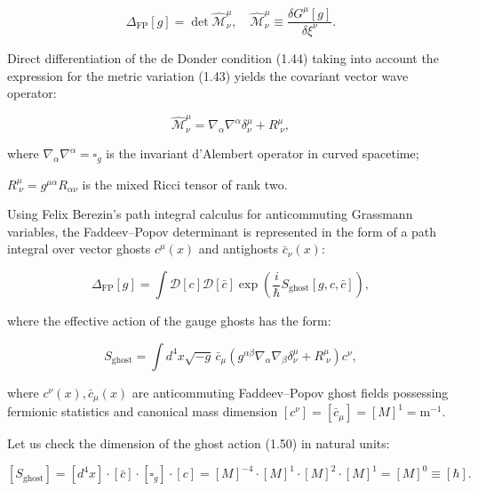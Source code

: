 \documentclass[11pt,a4paper]{article}
\theoremstyle{definition}
\begin{document}
\begin{equation}\label{eq:1.46}\tag{1.46}
\Delta_{\text{FP}}[g] = \det \hat{\mathcal{M}}^\mu_\nu, \quad \hat{\mathcal{M}}^\mu_\nu \equiv \frac{\delta G^\mu[g]}{\delta \xi^\nu}.
\end{equation}

Direct differentiation of the de Donder condition (1.44) taking into account the expression for the metric variation (1.43) yields the covariant vector wave operator:

\begin{equation}\label{eq:1.47}\tag{1.47}
\hat{\mathcal{M}}^\mu_\nu = \nabla_\alpha \nabla^\alpha \delta^\mu_\nu + R^\mu_{\;\nu},
\end{equation}

where $\nabla_\alpha \nabla^\alpha = \square_g$ is the invariant d'Alembert operator in curved spacetime;  

$R^\mu_{\;\nu} = g^{\mu\alpha} R_{\alpha\nu}$ is the mixed Ricci tensor of rank two.

Using Felix Berezin's path integral calculus for anticommuting Grassmann variables, the Faddeev--Popov determinant is represented in the form of a path integral over vector ghosts $c^\mu(x)$ and antighosts $\bar{c}_\nu(x)$:

\begin{equation}\label{eq:1.49}\tag{1.49}
\Delta_{\text{FP}}[g] = \int \mathcal{D}[c] \mathcal{D}[\bar{c}] \exp\left( \frac{i}{\hbar} S_{\text{ghost}}[g, c, \bar{c}] \right),
\end{equation}

where the effective action of the gauge ghosts has the form:

\begin{equation}\label{eq:1.50}\tag{1.50}
S_{\text{ghost}} = \int d^4x \sqrt{-g} \, \bar{c}_\mu \left( g^{\alpha\beta} \nabla_\alpha \nabla_\beta \delta^\mu_\nu + R^\mu_{\;\nu} \right) c^\nu,
\end{equation}

where $c^\nu(x), \bar{c}_\mu(x)$ are anticommuting Faddeev--Popov ghost fields possessing fermionic statistics and canonical mass dimension $[c^\nu] = [\bar{c}_\mu] = [M]^1 = \text{m}^{-1}$.

Let us check the dimension of the ghost action (1.50) in natural units:

\begin{equation}\label{eq:1.51}\tag{1.51}
[S_{\text{ghost}}] = [d^4x] \cdot [\bar{c}] \cdot [\square_g] \cdot [c] = [M]^{-4} \cdot [M]^1 \cdot [M]^2 \cdot [M]^1 = [M]^0 \equiv [\hbar].
\end{equation}
\end{document}
